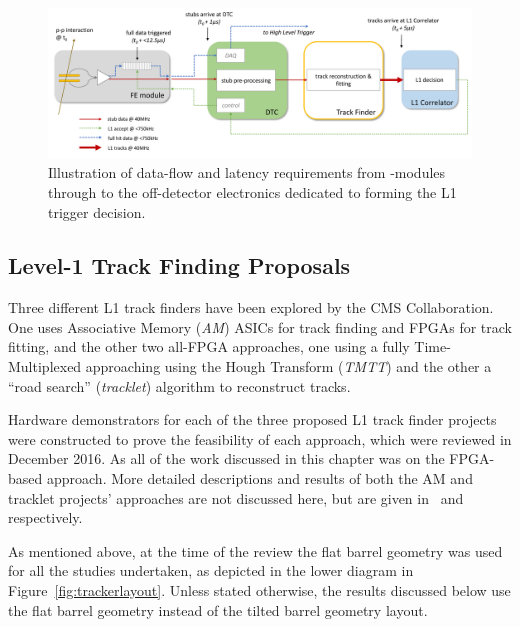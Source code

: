 \begin{figure}[tb]
\centering
\includegraphics[width=\textwidth]{figs/tk-upgrade/dataflow.pdf}
\caption{Illustration of data-flow and latency requirements from \pt-modules through to the off-detector electronics dedicated to forming the L1 trigger decision.}
\label{fig:dataFlow}
\end{figure}

\subsection{Level-1 Track Finding Proposals}\label{subsec:TrackFinderReview}

Three different L1 track finders have been explored by the CMS Collaboration.
One uses Associative Memory (\emph{AM}) ASICs for track finding and FPGAs for track fitting, and the other two all-FPGA approaches, one using a fully Time-Multiplexed approaching using the Hough Transform (\emph{TMTT}) and the other a ``road search'' (\emph{tracklet}) algorithm to reconstruct tracks.

Hardware demonstrators for each of the three proposed L1 track finder projects were constructed to prove the feasibility of each approach, which were reviewed in December 2016.
As all of the work discussed in this chapter was on the FPGA-based \HT approach.
More detailed descriptions and results of both the AM and tracklet projects' approaches are not discussed here, but are given in~\cite{AM,P2TrackerTDR} and~\cite{tracklet,P2TrackerTDR} respectively.

As mentioned above, at the time of the review the flat barrel geometry was used for all the studies undertaken, as depicted in the lower diagram in Figure~\ref{fig:trackerlayout}.
Unless stated otherwise, the results discussed below use the flat barrel geometry instead of the tilted barrel geometry layout.

